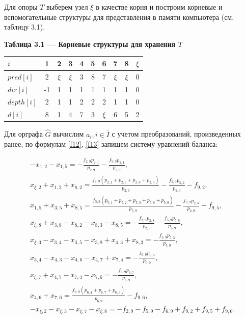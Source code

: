\documentclass[14pt]{extarticle}%
\begin{document}
Для опоры $T$ выберем узел $\xi$ в качестве корня и построим корневые и вспомогательные структуры для представления в памяти компьютера (см. таблицу 3.1).

\begin{center}
\textbf{Таблица 3.1 --- Корневые структуры для хранения $T$}\\
\begin{tabular}{l|ccccccccc}
 $i$ &1&2&3&4&5&6&7&8&$\xi$\\\hline
 $pred[i]$&2 & $\xi$ & $\xi$ & 3 & 8 & 7 & $\xi$ & $\xi$ & 0 \\
 $dir[i]$& -1 & 1 & 1 & 1 & 1 & 1 & 1 & 1 & 0 \\
 $depth[i]$&2 & 1 & 1 & 2 & 2 & 2 & 1 & 1 & 0 \\
 $d[i]$&8 & 1 & 4 & 7 & 3 & $\xi$ & 6 & 5 & 2 \\
\end{tabular}
\end{center}

Для орграфа $\widehat{G}$ вычислим $a_i, i\in \overline{I}$ с учетом преобразований, произведенных ранее, по формулам \eqref{f12}, \eqref{f13} запишем систему уравнений баланса:

\begin{equation}\begin{gathered}\label{f3.1.1}
	    -x_{1,2}-x_{1,5}=-\frac{f_{2,9} p_{2,1}}{p_{2,9}}-\frac{f_{5,9} p_{5,1}}{p_{5,9}},\\
    x_{\xi ,2}+x_{1,2}+x_{8,2}=\frac{f_{2,9} \left(p_{2,1}+p_{2,5}+p_{2,8}+p_{2,9}\right)}{p_{2,9}}-\frac{f_{5,9} p_{5,2}}{p_{5,9}}-f_{9,2},\\
    x_{1,5}+x_{3,5}+x_{8,5}=\frac{f_{5,9} \left(p_{5,1}+p_{5,2}+p_{5,3}+p_{5,8}+p_{5,9}\right)}{p_{5,9}}-\frac{f_{2,9} p_{2,5}}{p_{2,9}}-f_{9,5},\\
    x_{\xi ,8}+x_{3,8}-x_{8,2}-x_{8,3}-x_{8,5}=-\frac{f_{2,9} p_{2,8}}{p_{2,9}}-\frac{f_{5,9} p_{5,8}}{p_{5,9}},\\
    x_{\xi ,3}-x_{3,4}-x_{3,5}-x_{3,8}+x_{4,3}+x_{8,3}=-\frac{f_{5,9} p_{5,3}}{p_{5,9}},\\
    x_{3,4}-x_{4,3}-x_{4,6}-x_{4,7}+x_{7,4}=-\frac{f_{6,9} p_{6,4}}{p_{6,9}},\\
    x_{\xi ,7}+x_{4,7}-x_{7,4}-x_{7,6}=-\frac{f_{6,9} p_{6,7}}{p_{6,9}},\\
    x_{4,6}+x_{7,6}=\frac{f_{6,9} \left(p_{6,4}+p_{6,7}+p_{6,9}\right)}{p_{6,9}}-f_{9,6},\\
    -x_{\xi ,2}-x_{\xi ,3}-x_{\xi ,7}-x_{\xi ,8}=-f_{2,9}-f_{5,9}-f_{6,9}+f_{9,2}+f_{9,5}+f_{9,6}.
    \end{gathered}
\end{equation}
\end{document}
